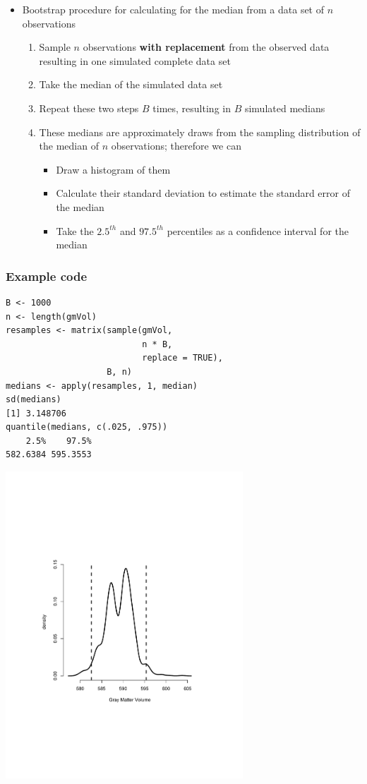 \documentclass[aspectratio=169]{beamer}
\begin{document}
\begin{frame}
\begin{itemize}
\item Bootstrap procedure for calculating for the median from a data
  set of $n$ observations
  \begin{enumerate}[$i.$]
  \item Sample $n$ observations {\bf with replacement} from the observed
    data resulting in one simulated complete data set
  \item Take the median of the simulated data set
  \item Repeat these two steps $B$ times, resulting in $B$ simulated
    medians
  \item These medians are approximately draws from the sampling distribution
    of the median of $n$ observations; therefore we can
    \begin{itemize}
    \item Draw a histogram of them
    \item Calculate their standard deviation to estimate the standard error
      of the median
    \item Take the $2.5^{th}$ and $97.5^{th}$ percentiles as a confidence interval
      for the median
    \end{itemize}
  \end{enumerate}
\end{itemize}
\end{frame}

\begin{frame}[fragile]\frametitle{Example code}
\begin{verbatim}
B <- 1000
n <- length(gmVol)
resamples <- matrix(sample(gmVol,
                           n * B,
                           replace = TRUE),
                    B, n)
medians <- apply(resamples, 1, median)
sd(medians)
[1] 3.148706
quantile(medians, c(.025, .975))
    2.5%    97.5% 
582.6384 595.3553 
\end{verbatim}
\end{frame}

\begin{frame}
\includegraphics[width=3.5in]{bootstrap.pdf}
\end{frame}
\end{document}
